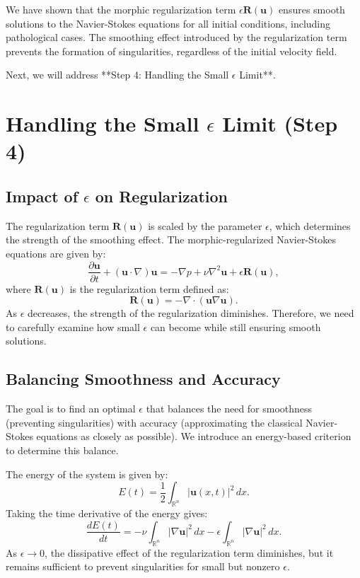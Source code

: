 \documentclass{article}
\begin{document}
We have shown that the morphic regularization term \( \epsilon \mathbf{R}(\mathbf{u}) \) ensures smooth solutions to the Navier-Stokes equations for all initial conditions, including pathological cases. The smoothing effect introduced by the regularization term prevents the formation of singularities, regardless of the initial velocity field.

Next, we will address **Step 4: Handling the Small \( \epsilon \) Limit**.

\section*{Handling the Small \( \epsilon \) Limit (Step 4)}

\subsection*{Impact of \( \epsilon \) on Regularization}

The regularization term \( \mathbf{R}(\mathbf{u}) \) is scaled by the parameter \( \epsilon \), which determines the strength of the smoothing effect. The morphic-regularized Navier-Stokes equations are given by:
\[
\frac{\partial \mathbf{u}}{\partial t} + (\mathbf{u} \cdot \nabla) \mathbf{u} = -\nabla p + \nu \nabla^2 \mathbf{u} + \epsilon \mathbf{R}(\mathbf{u}),
\]
where \( \mathbf{R}(\mathbf{u}) \) is the regularization term defined as:
\[
\mathbf{R}(\mathbf{u}) = -\nabla \cdot (\mathbf{u} \nabla \mathbf{u}).
\]
As \( \epsilon \) decreases, the strength of the regularization diminishes. Therefore, we need to carefully examine how small \( \epsilon \) can become while still ensuring smooth solutions.

\subsection*{Balancing Smoothness and Accuracy}

The goal is to find an optimal \( \epsilon \) that balances the need for smoothness (preventing singularities) with accuracy (approximating the classical Navier-Stokes equations as closely as possible). We introduce an energy-based criterion to determine this balance.

The energy of the system is given by:
\[
E(t) = \frac{1}{2} \int_{\mathbb{R}^n} |\mathbf{u}(x,t)|^2 \, dx.
\]
Taking the time derivative of the energy gives:
\[
\frac{dE(t)}{dt} = - \nu \int_{\mathbb{R}^n} |\nabla \mathbf{u}|^2 \, dx - \epsilon \int_{\mathbb{R}^n} |\nabla \mathbf{u}|^2 \, dx.
\]
As \( \epsilon \to 0 \), the dissipative effect of the regularization term diminishes, but it remains sufficient to prevent singularities for small but nonzero \( \epsilon \).
\end{document}
